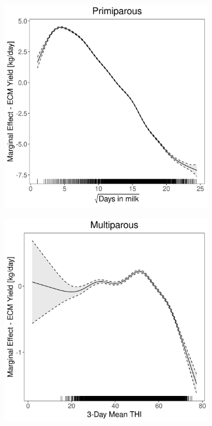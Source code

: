 \begin{figure}[H]
\begin{subfigure}[b]{0.45\textwidth}
    \end{subfigure}
    \hspace{0.05\textwidth} %
    \begin{subfigure}[b]{0.45\textwidth}
        \centering
        \includegraphics[width=\textwidth]{thesis/figures/models/ecm/full/je_ecm_full/je_ecm_full_marginal_dim_milk_primi.png}
    \end{subfigure}
    \begin{subfigure}[b]{0.45\textwidth}
        \centering
        \includegraphics[width=\textwidth]{thesis/figures/models/ecm/full/je_ecm_full/je_ecm_full_marginal_thi_milk_multi.png}

\end{subfigure}
\end{figure}
